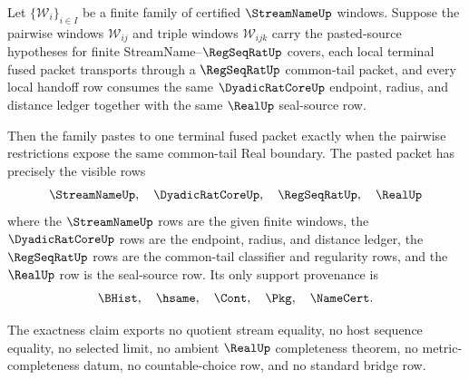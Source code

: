 \begin{theorem}
\label{thm:streamname-terminal-fusion-finite-cover-cocycle-exactness}
Let $\{\mathcal W_i\}_{i\in I}$ be a finite family of certified $\StreamNameUp$ windows. Suppose the pairwise windows $\mathcal W_{ij}$ and triple windows $\mathcal W_{ijk}$ carry the pasted-source hypotheses for finite StreamName--$\RegSeqRatUp$ covers, each local terminal fused packet transports through a $\RegSeqRatUp$ common-tail packet, and every local handoff row consumes the same $\DyadicRatCoreUp$ endpoint, radius, and distance ledger together with the same $\RealUp$ seal-source row.

Then the family pastes to one terminal fused packet exactly when the pairwise restrictions expose the same common-tail Real boundary. The pasted packet has precisely the visible rows
$$
\StreamNameUp,\quad \DyadicRatCoreUp,\quad \RegSeqRatUp,\quad \RealUp
$$
where the $\StreamNameUp$ rows are the given finite windows, the $\DyadicRatCoreUp$ rows are the endpoint, radius, and distance ledger, the $\RegSeqRatUp$ rows are the common-tail classifier and regularity rows, and the $\RealUp$ row is the seal-source row. Its only support provenance is
$$
\BHist,\quad \hsame,\quad \Cont,\quad \Pkg,\quad \NameCert.
$$

The exactness claim exports no quotient stream equality, no host sequence equality, no selected limit, no ambient $\RealUp$ completeness theorem, no metric-completeness datum, no countable-choice row, and no standard bridge row.
\end{theorem}
